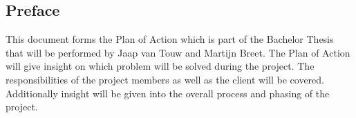 \subsection*{Preface}
\thispagestyle{fancy}
This document forms the Plan of Action which is part of the Bachelor Thesis that will be performed by Jaap van Touw and Martijn Breet. The Plan of Action will give insight on which problem will be solved during the project. The responsibilities of the project members as well as the client will be covered. Additionally insight will be given into the overall process and phasing of the project. 